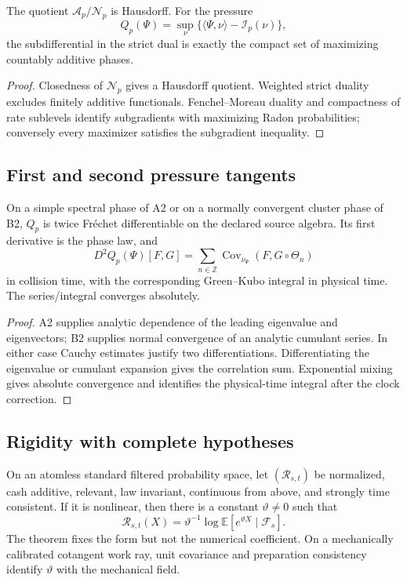 \begin{theorem}
\label{thm:rr2-c2-duality}
The quotient \(\mathscr A_p/\mathscr N_p\) is Hausdorff.  For the pressure
\[
 Q_p(\Psi)=\sup_\nu\{\langle\Psi,\nu\rangle-\mathcal I_p(\nu)\},
\]
the subdifferential in the strict dual is exactly the compact set of
maximizing countably additive phases.
\end{theorem}

\begin{proof}
Closedness of \(\mathscr N_p\) gives a Hausdorff quotient.  Weighted strict
duality excludes finitely additive functionals.  Fenchel--Moreau duality and
compactness of rate sublevels identify subgradients with maximizing Radon
probabilities; conversely every maximizer satisfies the subgradient
inequality.
\end{proof}

\subsection{First and second pressure tangents}

\begin{theorem}
\label{thm:rr2-c2-tangent}
On a simple spectral phase of A2 or on a normally convergent cluster phase of
B2, \(Q_p\) is twice Fr\'echet differentiable on the declared source
algebra.  Its first derivative is the phase law, and
\[
 D^2Q_p(\Psi)[F,G]
 =
 \sum_{n\in\mathbb Z}
 \operatorname{Cov}_{\nu_\Psi}
 (F,G\circ\Theta_n)
\]
in collision time, with the corresponding Green--Kubo integral in physical
time.  The series/integral converges absolutely.
\end{theorem}

\begin{proof}
A2 supplies analytic dependence of the leading eigenvalue and eigenvectors;
B2 supplies normal convergence of an analytic cumulant series.  In either
case Cauchy estimates justify two differentiations.  Differentiating the
eigenvalue or cumulant expansion gives the correlation sum.  Exponential
mixing gives absolute convergence and identifies the physical-time integral
after the clock correction.
\end{proof}

\subsection{Rigidity with complete hypotheses}

\begin{theorem}
\label{thm:rr2-c2-rigidity}
On an atomless standard filtered probability space, let
\((\mathcal R_{s,t})\) be normalized, cash additive, relevant, law invariant,
continuous from above, and strongly time consistent.  If it is nonlinear,
then there is a constant \(\vartheta\ne0\) such that
\[
 \mathcal R_{s,t}(X)=
 \vartheta^{-1}\log
 \mathbb E[e^{\vartheta X}\mid\mathcal F_s].
\]
The theorem fixes the form but not the numerical coefficient.
On a mechanically calibrated cotangent work ray, unit covariance and
preparation consistency identify \(\vartheta\) with the mechanical field.
\end{theorem}

